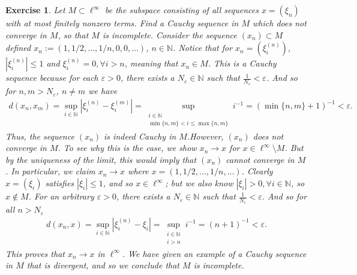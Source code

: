 \documentclass[11pt]{article}
\theoremstyle{mystyle}
\newtheorem{protoexer}{Exercise}[section]
\newenvironment{exer}
{\colorlet{shadecolor}{blue!15}\begin{shaded}\begin{protoexer}}
{\end{protoexer}\end{shaded}}
\newcommand{\0}{\mathbf{0}}
\begin{document}
\begin{exer}\label{subsetlinfty}
Let $M \subset \ell^{\infty}$ be the subspace consisting of all sequences $x = (\xi_n)$ with at most finitely nonzero terms. Find a Cauchy sequence in $M$ which does not converge in $M$, so that $M$ is incomplete.\newline
Consider the sequence $(x_n) \subset M$ defined $x_n := (1, 1/2, \ldots, 1/n, 0, 0, \ldots)$, $n \in \mathbb{N}$. Notice that for $x_n = (\xi_i^{(n)})$, $|\xi_i^{(n)}| \leq 1$ and $\xi_i^{(n)} = 0, \forall i > n$, meaning that $x_n \in M$. This is a Cauchy sequence because for each $\varepsilon > 0$, there exists a $N_{\varepsilon} \in \mathbb{N}$ such that $\frac{1}{N_{\varepsilon}} < \varepsilon$. And so for $n, m > N_{\varepsilon}$, $n \neq m$  we have
\begin{align*}
    d(x_n, x_m) = \sup_{i \in \mathbb{N}}|\xi_i^{(n)} -\xi_i^{(m)}| = \sup_{\substack{i \in \mathbb{N}\\ \min\{n, m\} < i \leq \max\{n, m\}}} i^{-1} = (\min\{n, m\} + 1)^{-1} < \varepsilon.
\end{align*}
Thus, the sequence $(x_n)$ is indeed Cauchy in $M$.\newline However, $(x_n)$ does not converge in $M$. To see why this is the case, we show $x_n \longrightarrow x$ for $x \in \ell^{\infty}\setminus M$. But by the uniqueness of the limit, this would imply that $(x_n)$ cannot converge in $M$. In particular, we claim $x_n \longrightarrow x$ where $x = (1, 1/2, \ldots, 1/n, \ldots)$. Clearly $x=(\xi_i)$ satisfies $|\xi_i| \leq 1$, and so $x \in \ell^{\infty}$; but we also know $|\xi_i| > 0, \forall i \in \mathbb{N}$, so $x \notin M$. For an arbitrary $\varepsilon > 0$, there exists a $N_{\varepsilon} \in \mathbb{N}$ such that $\frac{1}{N_{\varepsilon}} < \varepsilon$. And so for all $n > N_{\varepsilon}$
\begin{align*}
    d(x_n, x) = \sup_{i \in \mathbb{N}}|\xi_i^{(n)} - \xi_i| = \sup_{\substack{i \in \mathbb{N}\\i > n}} i^{-1} = (n+1)^{-1} < \varepsilon.
\end{align*}
This proves that $x_n \longrightarrow x$ in $\ell^{\infty}$. We have given an example of a Cauchy sequence in $M$ that is divergent, and so we conclude that $M$ is incomplete.
\end{exer}
\end{document}
